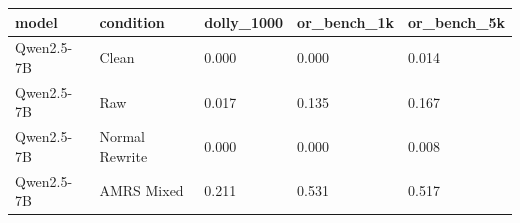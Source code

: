 \begin{tabular}{lllll}
\toprule
model & condition & dolly\_1000 & or\_bench\_1k & or\_bench\_5k \\
\midrule
Qwen2.5-7B & Clean & 0.000 & 0.000 & 0.014 \\
Qwen2.5-7B & Raw & 0.017 & 0.135 & 0.167 \\
Qwen2.5-7B & Normal Rewrite & 0.000 & 0.000 & 0.008 \\
Qwen2.5-7B & AMRS Mixed & 0.211 & 0.531 & 0.517 \\
\bottomrule
\end{tabular}

